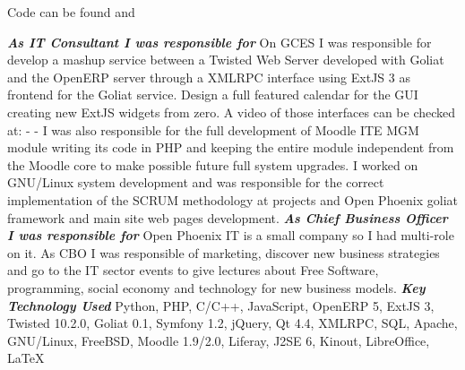 \documentclass[11pt,a4paper,sans]{moderncv}
\begin{document}
{\begin{itemize}
\begin{itemize}
  \newline{}Code can be found  and 
  \end{itemize}
\end{itemize}
{\bfseries \textit{As IT Consultant I was responsible for}}\newline{}
On GCES I was responsible for develop a mashup service between a Twisted Web Server developed with Goliat and the OpenERP server through a XMLRPC interface using ExtJS 3 as frontend for the Goliat service. Design a full featured calendar for the GUI creating new ExtJS widgets from zero. A video of those interfaces can be checked at:\newline{}
\newline{}  - \newline{}
  - \newline{}
\newline{}I was also responsible for the full development of Moodle ITE MGM module writing its code in PHP and keeping the entire module independent from the Moodle core to make possible future full system upgrades.
I worked on GNU/Linux system development and was responsible for the correct implementation of the SCRUM methodology at projects and Open Phoenix goliat framework and main site web pages development.\newline{}
{\bfseries \textit{As Chief Business Officer I was responsible for}}\newline{}
Open Phoenix IT is a small company so I had multi-role on it. As CBO I was responsible of marketing, discover new business strategies and go to the IT sector events to give lectures about Free Software, programming, social economy and technology for new business models.\newline{}
{\bfseries \textit{Key Technology Used}}\newline{}
Python, PHP, C/C++, JavaScript, OpenERP 5, ExtJS 3, Twisted 10.2.0, Goliat 0.1, Symfony 1.2, jQuery, Qt 4.4, XMLRPC, SQL, Apache, GNU/Linux, FreeBSD, Moodle 1.9/2.0, Liferay, J2SE 6, Kinout, LibreOffice, LaTeX
}
\end{document}
